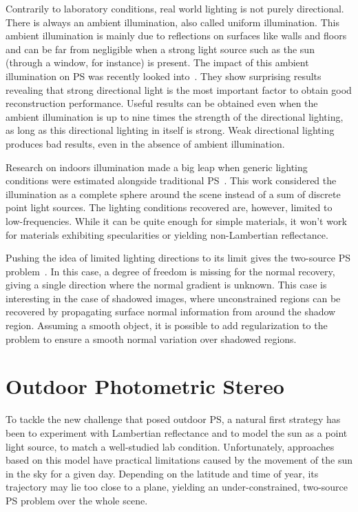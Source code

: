 Contrarily to laboratory conditions, real world lighting is not purely directional. There is always an ambient illumination, also called uniform illumination. This ambient illumination is mainly due to reflections on surfaces like walls and floors and can be far from negligible when a strong light source such as the sun (through a window, for instance) is present. The impact of this ambient illumination on PS was recently looked into~\cite{Angelopoulou2013}. They show surprising results revealing that strong directional light is the most important factor to obtain good reconstruction performance. Useful results can be obtained even when the ambient illumination is up to nine times the strength of the directional lighting, as long as this directional lighting in itself is strong. Weak directional lighting produces bad results, even in the absence of ambient illumination.

Research on indoors illumination made a big leap when generic lighting conditions were estimated alongside traditional PS~\cite{basri-ijcv-2007}. This work considered the illumination as a complete sphere around the scene instead of a sum of discrete point light sources. The lighting conditions recovered are, however, limited to low-frequencies. While it can be quite enough for simple materials, it won't work for materials exhibiting specularities or yielding non-Lambertian reflectance.

Pushing the idea of limited lighting directions to its limit gives the two-source PS problem~\cite{hernandez-pami-11}. In this case, a degree of freedom is missing for the normal recovery, giving a single direction where the normal gradient is unknown. This case is interesting in the case of shadowed images, where unconstrained regions can be recovered by propagating surface normal information from around the shadow region. Assuming a smooth object, it is possible to add regularization to the problem to ensure a smooth normal variation over shadowed regions.



\section{Outdoor Photometric Stereo}

To tackle the new challenge that posed outdoor PS, a natural first strategy has been to experiment with Lambertian reflectance and to model the sun as a point light source, to match a well-studied lab condition. Unfortunately, approaches based on this model have practical limitations caused by the movement of the sun in the sky for a given day. Depending on the latitude and time of year, its trajectory may lie too close to a plane, yielding an under-constrained, two-source PS problem over the whole scene.

